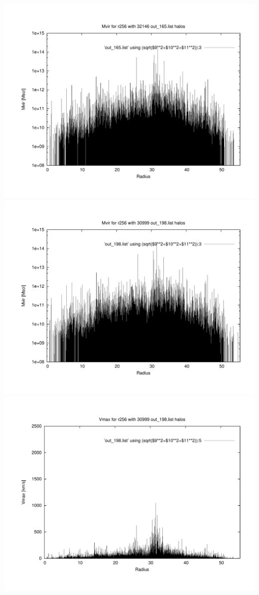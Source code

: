 \includegraphics[scale=0.3]{r256/h100/stages14_ling/plot_mvir_out_165.pdf}
\includegraphics[scale=0.3]{r256/h100/stages14_ling/plot_mvir_out_198.pdf}
\includegraphics[scale=0.3]{r256/h100/stages14_ling/plot_Vmax_out_198.pdf}
